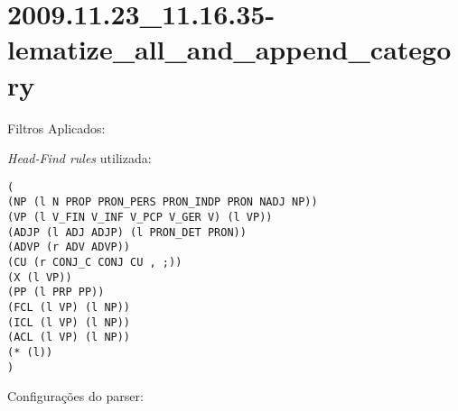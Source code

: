 \section{2009.11.23_11.16.35-lematize_all_and_append_category} %
\label{sec:exp:2009.11.23_11.16.35-lematize_all_and_append_category}

Filtros Aplicados:

\begin{itemize}
  
  \item{\emph{LematizeAllAndAppendCategory}
  
\end{itemize}

\emph{Head-Find rules} utilizada:

\scriptsize
\begin{verbatim}
(
(NP (l N PROP PRON_PERS PRON_INDP PRON NADJ NP))
(VP (l V_FIN V_INF V_PCP V_GER V) (l VP))
(ADJP (l ADJ ADJP) (l PRON_DET PRON))
(ADVP (r ADV ADVP))
(CU (r CONJ_C CONJ CU , ;))
(X (l VP))
(PP (l PRP PP))
(FCL (l VP) (l NP))
(ICL (l VP) (l NP))
(ACL (l VP) (l NP))
(* (l))
)

\end{verbatim}

\normalsize

Configurações do parser:


